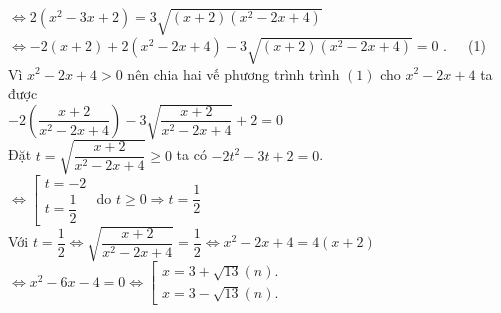\begin{ex}
{\begin{enumerate}
$\Leftrightarrow 2({x^2} - 3x + 2) = 3\sqrt {(x + 2)({x^2} - 2x + 4)} $\\
$ \Leftrightarrow - 2(x + 2) + 2({x^2} - 2x + 4) - 3\sqrt {(x + 2)({x^2} - 2x + 4)}  = 0$ .~~~(1)\\
Vì ${x^2} - 2x + 4 > 0$ nên chia hai vế phương trình trình $(1)$ cho ${x^2} - 2x + 4$  ta được\\
$ - 2\left( {\dfrac{{x + 2}}{{{x^2} - 2x + 4}}} \right) - 3\sqrt {\dfrac{{x + 2}}{{{x^2} - 2x + 4}}}  + 2 = 0$\\
Đặt $t = \sqrt {\dfrac{{x + 2}}{{{x^2} - 2x + 4}}}  \ge 0$  ta có $ - 2{t^2} - 3t + 2 = 0$.\\
$ \Leftrightarrow \left[ \begin{array}{l}
t =  - 2\\
t = \dfrac{1}{2}
\end{array} \right.$
do $t\geq 0 \Rightarrow t=\dfrac{1}{2} $\\
Với $t = \dfrac{1}{2} \Leftrightarrow \sqrt {\dfrac{{x + 2}}{{{x^2} - 2x + 4}}}  = \dfrac{1}{2} \Leftrightarrow {x^2} - 2x + 4 = 4(x + 2)$\\
$\Leftrightarrow{x^2} - 6x - 4 = 0 \Leftrightarrow \left[ \begin{array}{l}
x = 3 + \sqrt {13} \left( n \right).\\
x = 3 - \sqrt {13} \left( n \right).
\end{array} \right.$
    \end{enumerate}
    }
\end{ex}


